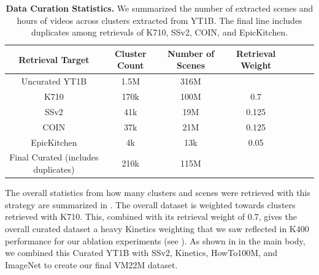 \documentclass[]{kling/kling}
\begin{document}
\begin{table}[h]
    \centering
    \small
    \caption{
      \textbf{Data Curation Statistics.} We summarized the number of extracted scenes and hours of videos across clusters extracted from YT1B. The final line includes duplicates among retrievals of K710, SSv2, COIN, and EpicKitchen.}
    \begin{tabular}{ccccccc}
    \toprule
    Retrieval Target & Cluster Count & Number of Scenes & Retrieval Weight  \\
    \midrule
    Uncurated YT1B & 1.5M & 316M  \\
    \midrule
    K710 & 170k & 100M &  0.7 \\
    SSv2 & 41k & 19M &  0.125 \\
    COIN & 37k & 21M &  0.125 \\
    EpicKitchen & 4k &  13k & 0.05 \\
    \midrule
    Final Curated (includes duplicates) & 210k & 115M
    \end{tabular}
    \label{table:retrieval_stats}
\end{table}
The overall statistics from how many clusters and scenes were retrieved with this strategy are summarized in .
The overall dataset is weighted towards clusters retrieved with K710. This, combined with its retrieval weight of 0.7, gives the overall curated dataset a heavy Kinetics weighting that we saw reflected in K400 performance for our ablation experiments (see ).
As shown in  in the main body, we combined this Curated YT1B with SSv2, Kinetics, HowTo100M, and ImageNet to create our final VM22M dataset.
\end{document}
